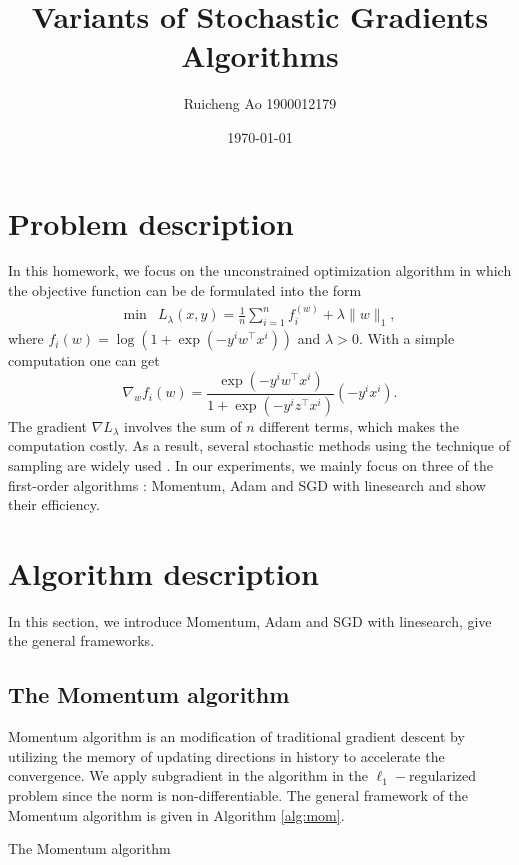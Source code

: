 \documentclass{article}
\title{Variants of Stochastic Gradients Algorithms}
\date{\today}
\author{Ruicheng Ao 1900012179}
\begin{document}
\maketitle
\section{Problem description}
In this homework, we focus on the unconstrained optimization algorithm in which the objective function can be de formulated into the form
\begin{equation}\label{prob}
\begin{array}{cc}
\min &L_\lambda(x,y)=\frac{1}{n}\sum_{i=1}^n f_i^(w)+\lambda\|w\|_1,
\end{array}
\end{equation}
where $f_i(w) = \log (1+\exp(-y^iw^\top x^i))$ and $\lambda > 0$. With a simple computation one can get
\begin{equation}\label{grad}
\nabla_w f_i(w) =\frac{\exp(-y^iw^\top x^i)}{1+\exp(-y^i z^\top x^i)}(-y^ix^i).
\end{equation}
The gradient $\nabla L_\lambda $ involves the sum of $n$ different terms, which makes the computation costly. As a result, several stochastic methods using the technique of sampling are widely used \cite[Section 8]{goodfellow2016deep}. In our experiments, we mainly focus on three of the first-order algorithms : Momentum, Adam and SGD with linesearch and show their efficiency.
\section{Algorithm description}
In this section, we introduce Momentum, Adam and SGD with linesearch, give the general frameworks.
\subsection{The Momentum algorithm}
Momentum algorithm is an modification of traditional gradient descent by utilizing the memory of updating directions in history to accelerate the convergence. We apply subgradient in the algorithm in the $\ell_1-$regularized problem since the norm is non-differentiable. The general framework of the Momentum algorithm is given in Algorithm \ref{alg:mom}.
\begin{algorithm}[H]
\caption{The Momentum algorithm}
\begin{algorithmic}[1]\label{alg:mom}
\ENDWHILE
{}
\end{algorithmic}
\end{algorithm}
\end{document}
